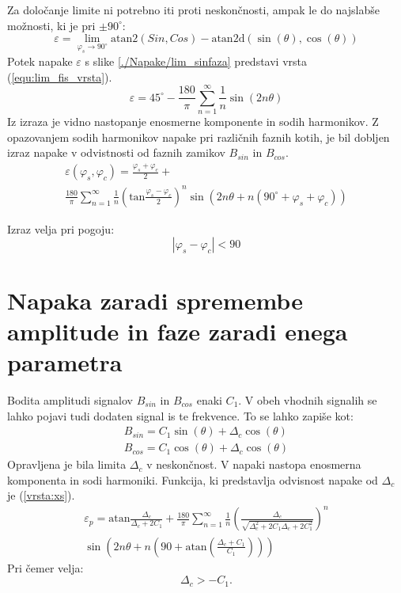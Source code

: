 Za določanje limite ni potrebno iti proti neskončnosti, ampak le do najslabše možnosti, ki je pri $\pm 90^\circ$:
\begin{equation}
\label{equ:fis_lim}
\varepsilon = \lim_{\varphi_{s} \rightarrow 90^\circ} \mathrm{atan2}(Sin ,Cos)- \mathrm{atan2d}(\sin(\theta),\cos(\theta))
\end{equation}
Potek napake $\varepsilon$ s slike \ref{./Napake/lim_sinfaza} predstavi vrsta (\ref{equ:lim_fis_vrsta}).
\begin{equation}
\label{equ:lim_fis_vrsta}
\varepsilon = 45^\circ - \frac{180}{\pi}\sum_{n=1}^{\infty}\frac{1}{n} \sin (2n \theta)
\end{equation} 
Iz  izraza je vidno nastopanje enosmerne komponente in sodih harmonikov. Z opazovanjem sodih harmonikov napake pri različnih faznih kotih, je bil dobljen izraz napake v odvistnosti od faznih zamikov $B_{sin}$ in $B_{cos}$.%
\begin{multline}
\label{equ:fis_err}
\varepsilon(\varphi_{s},\varphi_{c}) = \frac{\varphi_{s}+\varphi_{c}}{2}+\\ \frac{180}{\pi}\sum_{n=1}^{\infty}\frac{1}{n} (\mathrm{tan}\frac{\varphi_{s}-\varphi_{c}}{2})^n \sin (2n \theta+n(90^\circ +\varphi_{s}+\varphi_{c}))
\end{multline}

Izraz velja pri pogoju:
$$|\varphi_{s}-\varphi_{c}|<90$$

\section{Napaka zaradi spremembe amplitude in faze zaradi enega parametra}
\label{izpeljava_atan_napake_staticne}
Bodita amplitudi signalov $B_{sin}$ in $B_{cos}$ enaki $C_1$. V obeh vhodnih signalih se lahko pojavi tudi dodaten signal is te frekvence. To se lahko zapiše kot:
\begin{eqnarray}
\label{xs_analit}
B_{sin} = C_1 \sin(\theta) + \Delta_c \cos(\theta) \\
B_{cos} = C_1 \cos(\theta) + \Delta_c \cos(\theta)
\end{eqnarray}
Opravljena je bila limita $\Delta_c$ v neskončnost. V napaki nastopa enosmerna komponenta in sodi harmoniki. Funkcija, ki predstavlja odvisnost napake od $\Delta_c$ je (\ref{vrsta:xs}).
\begin{equation}
	\label{vrsta:xs}
	\begin{split}
	\varepsilon_p = \mathrm{atan}\frac{\Delta_c}{\Delta_c+2C_1}+\frac{180}{\pi} \sum_{n=1}^{\infty}\frac{1}{n} (\frac{\Delta_c}{\sqrt{\Delta_c^2+2 C_1\Delta_c+2C_1^2}})^n
	\\\sin (2n \theta+n (90+ \mathrm{ atan}(\frac{\Delta_c+C_1}{C_1})))\end{split}
\end{equation}
Pri čemer velja:
$$\Delta_c > -C_1.$$

